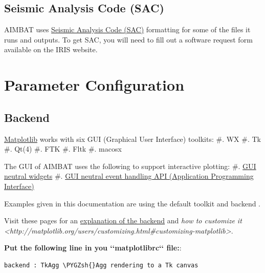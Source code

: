 \documentclass[letterpaper,10pt,english]{sphinxmanual}
\def\PYGZsh{\char`\#}
\begin{document}
\section{Seismic Analysis Code (SAC)}
\label{docfiles/analyzingData:seismic-analysis-code-sac}
AIMBAT uses \href{http://www.iris.edu/files/sac-manual/}{Seismic Analysis Code (SAC)} formatting for some of the files it runs and outputs. To get SAC, you will need to fill out a software request form available on the IRIS website.


\chapter{Parameter Configuration}
\label{docfiles/parameterConfiguration:parameter-configuration}\label{docfiles/parameterConfiguration::doc}

\section{Backend}
\label{docfiles/parameterConfiguration:backend}
\href{http://matplotlib.org/contents.html}{Matplotlib} works with six GUI (Graphical User Interface) toolkits:
\#. WX
\#. Tk
\#. Qt(4)
\#. FTK
\#. Fltk
\#. macosx

The GUI of AIMBAT uses the following to support interactive plotting:
\#. \href{http://matplotlib.org/api/widgets\_api.html}{GUI neutral widgets}
\#. \href{http://matplotlib.org/users/event\_handling.html}{GUI neutral event handling API (Application Programming Interface)}

Examples given in this documentation are using the default toolkit  and backend .

Visit these pages for an \href{http://matplotlib.org/faq/usage\_faq.html\#what-is-a-backend}{explanation of the backend} and \emph{how to customize it \textless{}http://matplotlib.org/users/customizing.html\#customizing-matplotlib\textgreater{}}.

\textbf{Put the following line in you {}`{}`matplotlibrc{}`{}` file:}:

\begin{Verbatim}[commandchars=\\\{\}]
backend : TkAgg \PYGZsh{}Agg rendering to a Tk canvas
\end{Verbatim}
\end{document}
